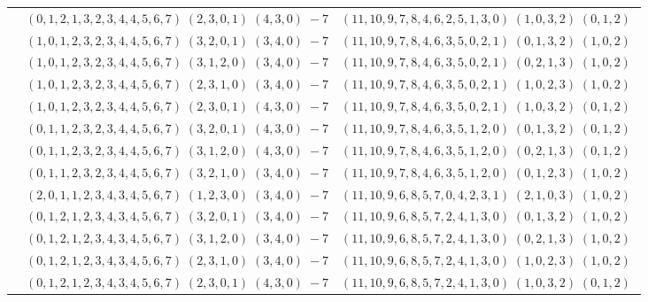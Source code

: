 \documentclass[11pt]{article}
\begin{document}
\begin{longtable}[l]{|c|c|c|}
 \cline{2-3} 
 & $(0 ,1 ,2 ,1 ,3 ,2 ,3 ,4 ,4 ,5 ,6 ,7) \;(2 ,3 ,0 ,1) \;(4 ,3 ,0) \;-7$ & $(11 ,10 ,9 ,7 ,8 ,4 ,6 ,2 ,5 ,1 ,3 ,0) \;(1 ,0 ,3 ,2) \;(0 ,1 ,2) \;$\\ 
 \cline{2-3} 
 & $(1 ,0 ,1 ,2 ,3 ,2 ,3 ,4 ,4 ,5 ,6 ,7) \;(3 ,2 ,0 ,1) \;(3 ,4 ,0) \;-7$ & $(11 ,10 ,9 ,7 ,8 ,4 ,6 ,3 ,5 ,0 ,2 ,1) \;(0 ,1 ,3 ,2) \;(1 ,0 ,2) \;$\\ 
 \cline{2-3} 
 & $(1 ,0 ,1 ,2 ,3 ,2 ,3 ,4 ,4 ,5 ,6 ,7) \;(3 ,1 ,2 ,0) \;(3 ,4 ,0) \;-7$ & $(11 ,10 ,9 ,7 ,8 ,4 ,6 ,3 ,5 ,0 ,2 ,1) \;(0 ,2 ,1 ,3) \;(1 ,0 ,2) \;$\\ 
 \cline{2-3} 
 & $(1 ,0 ,1 ,2 ,3 ,2 ,3 ,4 ,4 ,5 ,6 ,7) \;(2 ,3 ,1 ,0) \;(3 ,4 ,0) \;-7$ & $(11 ,10 ,9 ,7 ,8 ,4 ,6 ,3 ,5 ,0 ,2 ,1) \;(1 ,0 ,2 ,3) \;(1 ,0 ,2) \;$\\ 
 \cline{2-3} 
 & $(1 ,0 ,1 ,2 ,3 ,2 ,3 ,4 ,4 ,5 ,6 ,7) \;(2 ,3 ,0 ,1) \;(4 ,3 ,0) \;-7$ & $(11 ,10 ,9 ,7 ,8 ,4 ,6 ,3 ,5 ,0 ,2 ,1) \;(1 ,0 ,3 ,2) \;(0 ,1 ,2) \;$\\ 
 \cline{2-3} 
 & $(0 ,1 ,1 ,2 ,3 ,2 ,3 ,4 ,4 ,5 ,6 ,7) \;(3 ,2 ,0 ,1) \;(4 ,3 ,0) \;-7$ & $(11 ,10 ,9 ,7 ,8 ,4 ,6 ,3 ,5 ,1 ,2 ,0) \;(0 ,1 ,3 ,2) \;(0 ,1 ,2) \;$\\ 
 \cline{2-3} 
 & $(0 ,1 ,1 ,2 ,3 ,2 ,3 ,4 ,4 ,5 ,6 ,7) \;(3 ,1 ,2 ,0) \;(4 ,3 ,0) \;-7$ & $(11 ,10 ,9 ,7 ,8 ,4 ,6 ,3 ,5 ,1 ,2 ,0) \;(0 ,2 ,1 ,3) \;(0 ,1 ,2) \;$\\ 
 \cline{2-3} 
 & $(0 ,1 ,1 ,2 ,3 ,2 ,3 ,4 ,4 ,5 ,6 ,7) \;(3 ,2 ,1 ,0) \;(3 ,4 ,0) \;-7$ & $(11 ,10 ,9 ,7 ,8 ,4 ,6 ,3 ,5 ,1 ,2 ,0) \;(0 ,1 ,2 ,3) \;(1 ,0 ,2) \;$\\ 
 \cline{2-3} 
 & $(2 ,0 ,1 ,1 ,2 ,3 ,4 ,3 ,4 ,5 ,6 ,7) \;(1 ,2 ,3 ,0) \;(3 ,4 ,0) \;-7$ & $(11 ,10 ,9 ,6 ,8 ,5 ,7 ,0 ,4 ,2 ,3 ,1) \;(2 ,1 ,0 ,3) \;(1 ,0 ,2) \;$\\ 
 \cline{2-3} 
 & $(0 ,1 ,2 ,1 ,2 ,3 ,4 ,3 ,4 ,5 ,6 ,7) \;(3 ,2 ,0 ,1) \;(3 ,4 ,0) \;-7$ & $(11 ,10 ,9 ,6 ,8 ,5 ,7 ,2 ,4 ,1 ,3 ,0) \;(0 ,1 ,3 ,2) \;(1 ,0 ,2) \;$\\ 
 \cline{2-3} 
 & $(0 ,1 ,2 ,1 ,2 ,3 ,4 ,3 ,4 ,5 ,6 ,7) \;(3 ,1 ,2 ,0) \;(3 ,4 ,0) \;-7$ & $(11 ,10 ,9 ,6 ,8 ,5 ,7 ,2 ,4 ,1 ,3 ,0) \;(0 ,2 ,1 ,3) \;(1 ,0 ,2) \;$\\ 
 \cline{2-3} 
 & $(0 ,1 ,2 ,1 ,2 ,3 ,4 ,3 ,4 ,5 ,6 ,7) \;(2 ,3 ,1 ,0) \;(3 ,4 ,0) \;-7$ & $(11 ,10 ,9 ,6 ,8 ,5 ,7 ,2 ,4 ,1 ,3 ,0) \;(1 ,0 ,2 ,3) \;(1 ,0 ,2) \;$\\ 
 \cline{2-3} 
 & $(0 ,1 ,2 ,1 ,2 ,3 ,4 ,3 ,4 ,5 ,6 ,7) \;(2 ,3 ,0 ,1) \;(4 ,3 ,0) \;-7$ & $(11 ,10 ,9 ,6 ,8 ,5 ,7 ,2 ,4 ,1 ,3 ,0) \;(1 ,0 ,3 ,2) \;(0 ,1 ,2) \;$\\ 

\end{longtable}
\end{document}
